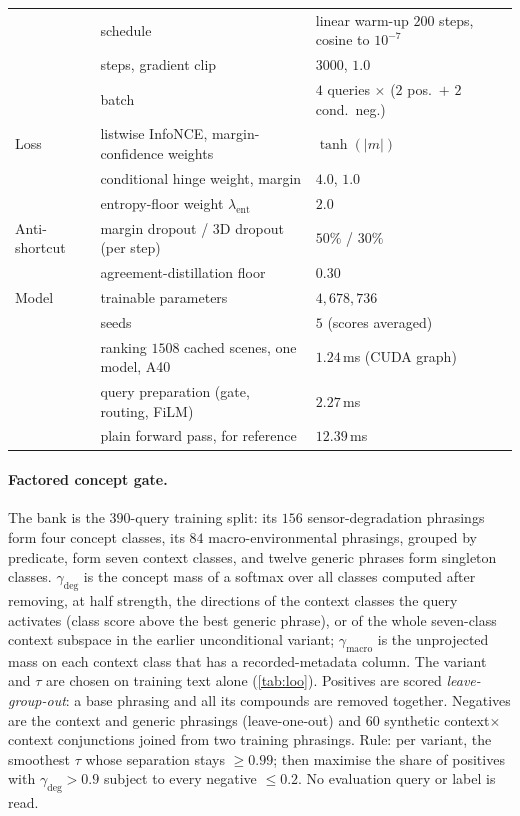 \documentclass[10pt,letterpaper]{article}
\begin{document}
\begin{table}[h]
\begin{tabular}{lll}
 & schedule & linear warm-up $200$ steps, cosine to $10^{-7}$\\
 & steps, gradient clip & $3000$, $1.0$\\
 & batch & $4$ queries $\times$ ($2$ pos.\ $+$ $2$ cond.\ neg.)\\
Loss & listwise InfoNCE, margin-confidence weights & $\tanh(|m|)$\\
 & conditional hinge weight, margin & $4.0$, $1.0$\\
 & entropy-floor weight $\lambda_{\mathrm{ent}}$ & $2.0$\\
Anti-shortcut & margin dropout / 3D dropout (per step) & $50\%$ / $30\%$\\
 & agreement-distillation floor & $0.30$\\
Model & trainable parameters & $4{,}678{,}736$\\
 & seeds & $5$ (scores averaged)\\
 & ranking $1508$ cached scenes, one model, A40 & $1.24$\,ms (CUDA graph)\\
 & query preparation (gate, routing, FiLM) & $2.27$\,ms\\
 & plain forward pass, for reference & $12.39$\,ms\\
\bottomrule
\end{tabular}
\end{table}

\paragraph{Factored concept gate.} The bank is the $390$-query training split: its
$156$ sensor-degradation phrasings form four concept classes, its $84$
macro-environmental phrasings, grouped by predicate, form seven context classes,
and twelve generic phrases form singleton classes. $\gamma_{\mathrm{deg}}$ is the
concept mass of a softmax over all classes computed after removing, at half
strength, the directions of the context classes the query activates (class score
above the best generic phrase), or of the whole seven-class context
subspace in the earlier unconditional variant;
$\gamma_{\mathrm{macro}}$ is the unprojected mass on each context class that has
a recorded-metadata column. The variant and $\tau$ are chosen on training text
alone (\cref{tab:loo}). Positives are scored \emph{leave-group-out}: a base
phrasing and all its compounds are removed together. Negatives are the context
and generic phrasings (leave-one-out) and $60$ synthetic context$\times$context
conjunctions joined from two training phrasings. Rule: per variant, the smoothest
$\tau$ whose separation stays $\ge0.99$; then maximise the share of positives with
$\gamma_{\mathrm{deg}}>0.9$ subject to every negative $\le0.2$. No evaluation
query or label is read.
\end{document}
